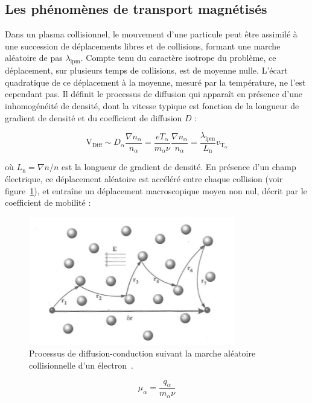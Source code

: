 \begin{refsection}
\subsection{Les phénomènes de transport magnétisés}
Dans un plasma collisionnel, le mouvement d'une particule peut être assimilé à
une succession de déplacements libres et de collisions, formant une marche
aléatoire de pas $\lambda_\text{lpm}$. Compte tenu du caractère isotrope du
problème, ce déplacement, sur plusieurs temps de collisions, est de
moyenne nulle. L'écart quadratique de ce déplacement à la moyenne, mesuré par la
température, ne l'est cependant pas. Il définit le processus de diffusion qui
apparaît en présence d'une inhomogénéité de densité, dont la vitesse typique est
fonction de la longueur de gradient de densité et du coefficient de diffusion
$D$ :
 
\begin{equation}
    \text{V}_\text{Diff}\sim D_\alpha\frac{\nabla
    n_\alpha}{n_\alpha}=\frac{eT_\alpha}{m_\alpha\nu}\frac{\nabla
    n_\alpha}{n_\alpha}=\frac{\lambda_\text{lpm}}{L_\text{n}}v_{\text{T}_\alpha}
\end{equation}
 
où $L_\text{n}=\nabla n/n$ est la longueur de gradient de densité. 
En présence d'un champ électrique, ce déplacement aléatoire est accéléré entre
chaque collision (voir figure~\ref{1-collisions}), et entraîne un déplacement
macroscopique moyen non nul, décrit par le coefficient de mobilité :
\begin{figure}
\centering
\includegraphics[width=0.8\textwidth]{figures/1-collisions.jpg}
{\caption{Processus de diffusion-conduction suivant la marche aléatoire
collisionnelle d'un électron~{\cite{Rax}}.}\label{1-collisions}}
\end{figure}
\begin{equation}
    \mu_\alpha=\frac{q_\alpha}{m_\alpha\nu}
\end{equation}
 

\end{refsection}
